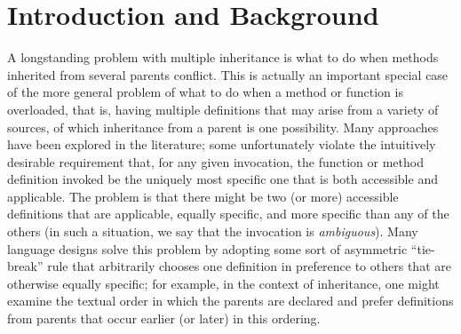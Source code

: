 \makeatletter
\def\@listi{\topsep=4pt plus 2pt   \parsep=\parskip  \partopsep=0pt plus 1pt }
\makeatother

\newcommand\BNF{\(\mathrel{\mathtt{:}}\mathrel{\mathtt{:}}=\)}
\newcommand\ALT{\(|\)}
\newcommand\TERM[1]{{\tt #1}}
\newcommand\NT[1]{{\it #1\/}}
\newcommand\GROUP[1]{\(\bigl(\)#1\(\bigr)\)}
\newcommand\OPTIONAL{{\small\(^?\)}}
\newcommand\KLEENE{\(^*\)}
\newcommand\KLEENEPLUS{\(^+\)}

  \let\1=\fortresscodeindentone
  \let\2=\fortresscodeindenttwo


\let\codeexamplesize=\small

\section{Introduction and Background}


A longstanding problem with multiple inheritance is what to do when
methods inherited from several parents conflict.  This is actually
an important special case of the more general problem of
what to do when a method or function is overloaded, that is,
having multiple definitions that may arise from a variety of sources,
of which inheritance from a parent is one possibility.
Many approaches have
been explored in the literature; some unfortunately violate the
intuitively desirable requirement that, for any given invocation,
the function or method definition invoked
be the uniquely most specific one that is both accessible and
applicable.  The problem is that there might be two (or more)
accessible definitions that are applicable, equally specific,
and more specific than any of the others (in such a situation,
we say that the invocation is \emph{ambiguous}).
Many language designs solve this problem by adopting some sort of asymmetric
``tie-break'' rule that arbitrarily chooses one definition in preference to others
that are otherwise equally specific; for example, in the context of inheritance,
one might examine the textual order in which the parents are declared
and prefer definitions from parents that occur earlier (or later) in this ordering.

